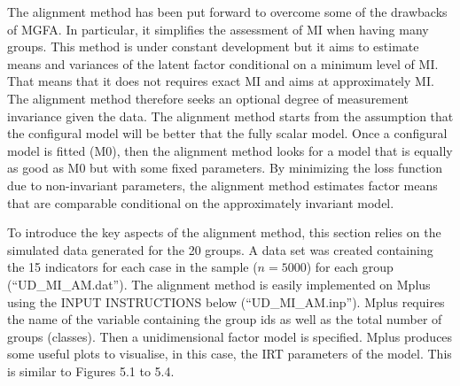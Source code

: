 \documentclass[]{book}
\newenvironment{Shaded}{\begin{snugshade}}{\end{snugshade}}
\newcommand{\DataTypeTok}[1]{\textcolor[rgb]{0.13,0.29,0.53}{#1}}
\newcommand{\DecValTok}[1]{\textcolor[rgb]{0.00,0.00,0.81}{#1}}
\newcommand{\KeywordTok}[1]{\textcolor[rgb]{0.13,0.29,0.53}{\textbf{#1}}}
\newcommand{\NormalTok}[1]{#1}
\newcommand{\OperatorTok}[1]{\textcolor[rgb]{0.81,0.36,0.00}{\textbf{#1}}}
\newcommand{\StringTok}[1]{\textcolor[rgb]{0.31,0.60,0.02}{#1}}
\begin{document}
The alignment method has been put forward to overcome some of the drawbacks of MGFA. In particular, it simplifies the assessment of MI when having many groups. This method is under constant development but it aims to estimate means and variances of the latent factor conditional on a minimum level of MI. That means that it does not requires exact MI and aims at approximately MI. The alignment method therefore seeks an optional degree of measurement invariance given the data. The alignment method starts from the assumption that the configural model will be better that the fully scalar model. Once a configural model is fitted (M0), then the alignment method looks for a model that is equally as good as M0 but with some fixed parameters. By minimizing the loss function due to non-invariant parameters, the alignment method estimates factor means that are comparable conditional on the approximately invariant model.

\begin{Shaded}
\end{Shaded}

To introduce the key aspects of the alignment method, this section relies on the simulated data generated for the 20 groups. A data set was created containing the 15 indicators for each case in the sample (\(n=5000\)) for each group (``UD\_MI\_AM.dat''). The alignment method is easily implemented on Mplus using the INPUT INSTRUCTIONS below (``UD\_MI\_AM.inp''). Mplus requires the name of the variable containing the group ids as well as the total number of groups (classes). Then a unidimensional factor model is specified. Mplus produces some useful plots to visualise, in this case, the IRT parameters of the model. This is similar to Figures 5.1 to 5.4.
\end{document}
